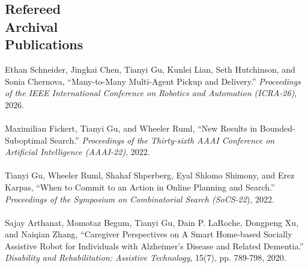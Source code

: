 \documentclass[margin, 10pt]{res} %
\begin{document}
\begin{resume}
\section{Refereed\\Archival\\Publications}
Ethan Schneider, Jingkai Chen, Tianyi Gu, Kunlei Lian, Seth Hutchinson, and Sonia Chernova, ``Many-to-Many Multi-Agent Pickup and Delivery.'' {\sl Proceedings of the IEEE International Conference on Robotics and Automation (ICRA-26)}, 2026.\\~\\
Maximilian Fickert, Tianyi Gu, and Wheeler Ruml, ``New Results in Bounded-Suboptimal Search.'' {\sl Proceedings of the Thirty-sixth AAAI Conference on Artificial Intelligence (AAAI-22)}, 2022.\\~\\
Tianyi Gu, Wheeler Ruml, Shahaf Shperberg, Eyal Shlomo Shimony, and Erez Karpas, ``When to Commit to an Action in Online Planning and Search.'' {\sl Proceedings of the Symposium on Combinatorial Search (SoCS-22}), 2022.\\~\\
Sajay Arthanat, Momotaz Begum, Tianyi Gu, Dain P. LaRoche, Dongpeng Xu, and Naiqian Zhang, ``Caregiver Perspectives on A Smart Home-based Socially Assistive Robot for Individuals with Alzheimer's Disease and Related Dementia.'' {\sl Disability and Rehabilitation: Assistive Technology}, 15(7), pp. 789-798, 2020.\\~\\

\end{resume}
\end{document}
